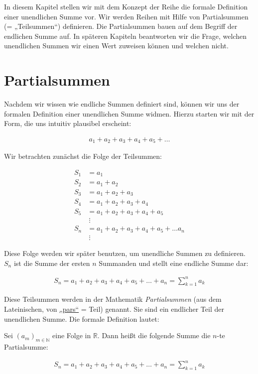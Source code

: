 \documentclass[fontsize=9pt,
               parskip=half-,
               DIV=14,
               listof=chapterentry,
               tocflat]{scrbook}
\begin{document}
In diesem Kapitel stellen wir mit dem Konzept der Reihe die formale Definition einer unendlichen Summe vor. Wir werden Reihen mit Hilfe von Partialsummen (= „Teilsummen“) definieren. Die Partialsummen bauen auf dem Begriff der endlichen Summe auf. In späteren Kapiteln beantworten wir die Frage, welchen unendlichen Summen wir einen Wert zuweisen können und welchen nicht.

\section{Partialsummen}

Nachdem wir wissen wie endliche Summen definiert sind, können wir uns der formalen Definition einer unendlichen Summe widmen. Hierzu starten wir mit der Form, die uns intuitiv plausibel erscheint:

\begin{align*}
a_{1}+a_{2}+a_{3}+a_{4}+a_{5}+\ldots 
\end{align*}

Wir betrachten zunächst die Folge der Teilsummen:

\begin{align*}
S_{1}&=a_{1}\\S_{2}&=a_{1}+a_{2}\\S_{3}&=a_{1}+a_{2}+a_{3}\\S_{4}&=a_{1}+a_{2}+a_{3}+a_{4}\\S_{5}&=a_{1}+a_{2}+a_{3}+a_{4}+a_{5}\\&\ \vdots \\S_{n}&=a_{1}+a_{2}+a_{3}+a_{4}+a_{5}+\ldots a_{n}\\&\ \vdots 
\end{align*}

Diese Folge werden wir später benutzen, um unendliche Summen zu definieren. $S_{n}$ ist die Summe der ersten $n$ Summanden und stellt eine endliche Summe dar:

\begin{align*}
S_{n}=a_{1}+a_{2}+a_{3}+a_{4}+a_{5}+\ldots +a_{n}=\sum _{k=1}^{n}a_{k}
\end{align*}

Diese Teilsummen werden in der Mathematik \emph{Partialsummen} (aus dem Lateinischen, von \href{https://de.wiktionary.org/wiki/pars}
{„pars“} = Teil) genannt. Sie sind ein endlicher Teil der unendlichen Summe. Die formale Definition lautet:

\begin{definition*}[Partialsumme]
Sei $(a_{m})_{m\in \mathbb {N} }$ eine Folge in $\mathbb {R} $. Dann heißt die folgende Summe die $n$-te Partialsumme:

\begin{align*}
S_{n}=a_{1}+a_{2}+a_{3}+a_{4}+a_{5}+\ldots +a_{n}=\sum _{k=1}^{n}a_{k}
\end{align*}

\end{definition*}
\end{document}
